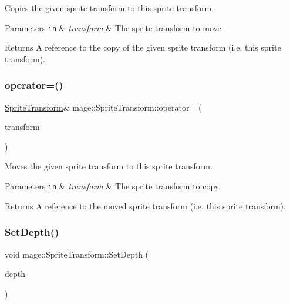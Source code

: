 Copies the given sprite transform to this sprite transform.


\begin{DoxyParams}[1]{Parameters}
\mbox{\tt in}  & {\em transform} & The sprite transform to move. \\
\hline
\end{DoxyParams}
\begin{DoxyReturn}{Returns}
A reference to the copy of the given sprite transform (i.\+e. this sprite transform). 
\end{DoxyReturn}
\hypertarget{structmage_1_1_sprite_transform_a9278d3fd0a6d346b188515b67a1adfc2}{}\label{structmage_1_1_sprite_transform_a9278d3fd0a6d346b188515b67a1adfc2} 
\subsubsection{\texorpdfstring{operator=()}{operator=()}\hspace{0.1cm}{\footnotesize\ttfamily [2/2]}}
{\footnotesize\ttfamily \hyperlink{structmage_1_1_sprite_transform}{Sprite\+Transform}\& mage\+::\+Sprite\+Transform\+::operator= (\begin{DoxyParamCaption}\item[{\hyperlink{structmage_1_1_sprite_transform}{Sprite\+Transform} \&\&}]{transform }\end{DoxyParamCaption})\hspace{0.3cm}{\ttfamily [default]}}

Moves the given sprite transform to this sprite transform.


\begin{DoxyParams}[1]{Parameters}
\mbox{\tt in}  & {\em transform} & The sprite transform to copy. \\
\hline
\end{DoxyParams}
\begin{DoxyReturn}{Returns}
A reference to the moved sprite transform (i.\+e. this sprite transform). 
\end{DoxyReturn}
\hypertarget{structmage_1_1_sprite_transform_a1ea0ccde7635fa76483ca4f1a61a6aef}{}\label{structmage_1_1_sprite_transform_a1ea0ccde7635fa76483ca4f1a61a6aef} 
\subsubsection{\texorpdfstring{Set\+Depth()}{SetDepth()}}
{\footnotesize\ttfamily void mage\+::\+Sprite\+Transform\+::\+Set\+Depth (\begin{DoxyParamCaption}\item[{\hyperlink{namespacemage_a6a44ad388483959dc4dff9f2aef91431}{f32}}]{depth }\end{DoxyParamCaption})\hspace{0.3cm}{\ttfamily [noexcept]}}

